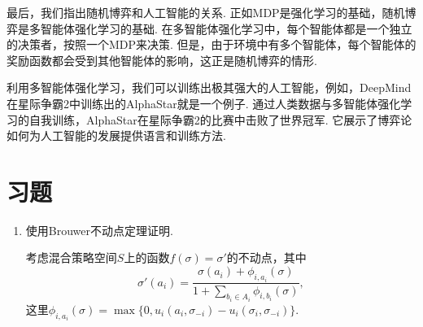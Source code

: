 最后，我们指出随机博弈和人工智能的关系. 正如MDP是强化学习的基础，随机博弈是多智能体强化学习的基础. 在多智能体强化学习中，每个智能体都是一个独立的决策者，按照一个MDP来决策. 但是，由于环境中有多个智能体，每个智能体的奖励函数都会受到其他智能体的影响，这正是随机博弈的情形. 

利用多智能体强化学习，我们可以训练出极其强大的人工智能，例如，DeepMind在星际争霸2中训练出的AlphaStar就是一个例子. 通过人类数据与多智能体强化学习的自我训练，AlphaStar在星际争霸2的比赛中击败了世界冠军. 它展示了博弈论如何为人工智能的发展提供语言和训练方法. 

\section{习题}
\begin{enumerate}[wide, labelindent=0pt]
    \item \label{exercise:proof-Nash-existence} 使用Brouwer不动点定理证明.
        \begin{hint}
        考虑混合策略空间$S$上的函数$f(\sigma) = \sigma'$的不动点，其中
        \[\sigma'(a_i) = \frac{\sigma(a_i) + \phi_{i,a_i}(\sigma)}{1+\sum_{b_i\in A_i}\phi_{i,b_i}(\sigma)},\]
        这里$\phi_{i,a_i}(\sigma)=\max\{0, u_i(a_i,\sigma_{-i})-u_i(\sigma_i,\sigma_{-i})\}$. 
        \end{hint}
\end{enumerate}






